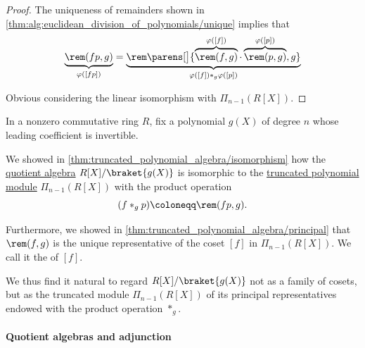 \begin{proof}
  The uniqueness of remainders shown in \cref{thm:alg:euclidean_division_of_polynomials/unique} implies that
  \begin{equation*}
    \underbrace{\rem(fp, g)}_{\varphi([fp])}
    =
    \underbrace{\rem\parens[\big]{ \overbrace{\rem(f, g)}^{\varphi([f])} \cdot \overbrace{\rem(p, g)}^{\varphi([p])}, g }}_{\varphi([f]) \ast_g \varphi([p])}
  \end{equation*}

   Obvious considering the linear isomorphism with \( \Pi_{n-1}(R[X]) \).
\end{proof}

\begin{definition}\label{def:quotient_polynomial_algebra_as_truncated}\mimprovised
  In a nonzero commutative ring \( R \), fix a polynomial \( g(X) \) of degree \( n \) whose leading coefficient is invertible.

  We showed in \cref{thm:truncated_polynomial_algebra/isomorphism} how the \hyperref[def:algebra_over_ring/quotient]{quotient algebra} \( R[X] / \braket{ g(X) } \) is isomorphic to the \hyperref[def:truncated_polynomial_algebra]{truncated polynomial module} \( \Pi_{n-1}(R[X]) \) with the product operation
  \begin{equation*}
     (f \ast_g p) \coloneqq \rem(fp, g).
  \end{equation*}

  Furthermore, we showed in \cref{thm:truncated_polynomial_algebra/principal} that \( \rem(f, g) \) is the unique representative of the coset \( [f] \) in \( \Pi_{n-1}(R[X]) \). We call it the  of \( [f] \).

  We thus find it natural to regard \( R[X] / \braket{ g(X) } \) not as a family of cosets, but as the truncated module \( \Pi_{n-1}(R[X]) \) of its principal representatives endowed with the product operation \( {\ast_g} \).
\end{definition}

\paragraph{Quotient algebras and adjunction}

